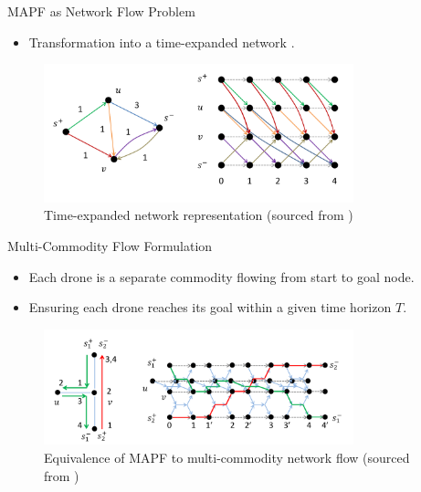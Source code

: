 \begin{frame}{MAPF as Network Flow Problem}
    \begin{itemize}
        \item Transformation into a time-expanded network  \cite{yu_timeoptimal}.
    \end{itemize}
    \begin{figure}[H]
        \centering
        \includegraphics[width=0.8\textwidth]{img/time_extended_net_image.pdf}
        \caption{Time-expanded network representation (sourced from \cite{time_optimal_slides})}
        \label{fig:time_expanded_network}
    \end{figure}
\end{frame}

\begin{frame}{Multi-Commodity Flow Formulation}
    \begin{itemize}
        \item Each drone is a separate commodity flowing from start to goal node.
        \item Ensuring each drone reaches its goal within a given time horizon $T$.
    \end{itemize}
    \begin{figure}[H]
        \centering
        \includegraphics[width=0.8\textwidth]{img/equi_mapf_flow_image.pdf}
        \caption{Equivalence of MAPF to multi-commodity network flow (sourced from \cite{time_optimal_slides})}
        \label{fig:equi_mapf_flow}
    \end{figure}
\end{frame}

